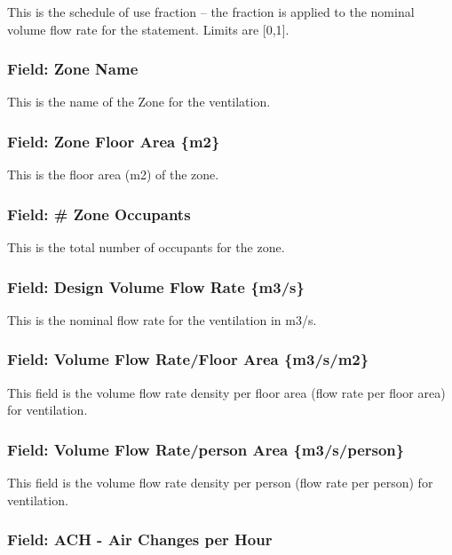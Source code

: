 This is the schedule of use fraction -- the fraction is applied to the nominal volume flow rate for the statement. Limits are {[}0,1{]}.

\subsubsection{Field: Zone Name}\label{field-zone-name-8}

This is the name of the Zone for the ventilation.

\subsubsection{Field: Zone Floor Area \{m2\}}\label{field-zone-floor-area-m2-6}

This is the floor area (m2) of the zone.

\subsubsection{Field: \# Zone Occupants}\label{field-zone-occupants-6}

This is the total number of occupants for the zone.

\subsubsection{Field: Design Volume Flow Rate \{m3/s\}}\label{field-design-volume-flow-rate-m3s-1}

This is the nominal flow rate for the ventilation in m3/s.

\subsubsection{Field: Volume Flow Rate/Floor Area \{m3/s/m2\}}\label{field-volume-flow-ratefloor-area-m3sm2-1}

This field is the volume flow rate density per floor area (flow rate per floor area) for ventilation.

\subsubsection{Field: Volume Flow Rate/person Area \{m3/s/person\}}\label{field-volume-flow-rateperson-area-m3sperson}

This field is the volume flow rate density per person (flow rate per person) for ventilation.

\subsubsection{Field: ACH - Air Changes per Hour}\label{field-ach---air-changes-per-hour-1}

